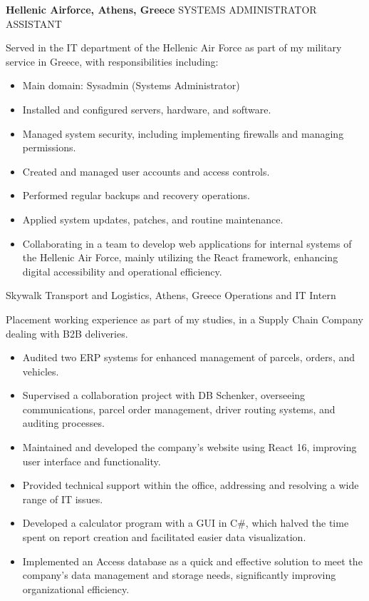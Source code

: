 {\textbf{Hellenic Airforce, Athens, Greece}}
{SYSTEMS ADMINISTRATOR ASSISTANT}
{
    Served in the IT department of the Hellenic Air Force as part of my military service in Greece, with
    responsibilities including:
    \begin{itemize}
        \item Main domain: Sysadmin (Systems Administrator)
        \item Installed and configured servers, hardware, and software.
        \item Managed system security, including implementing firewalls and managing permissions.
        \item Created and managed user accounts and access controls.
        \item Performed regular backups and recovery operations.
        \item Applied system updates, patches, and routine maintenance.
        \item Collaborating in a team to develop web applications for internal systems of the Hellenic Air Force, mainly utilizing
              the React framework, enhancing digital accessibility and operational efficiency.
    \end{itemize}
}

{Skywalk Transport and Logistics, Athens, Greece }
{Operations and IT Intern}
{

    Placement working experience as part of my studies, in a Supply Chain Company dealing with B2B deliveries.
    \begin{itemize}
        \item Audited two ERP systems for enhanced management of parcels, orders, and vehicles.
        \item Supervised a collaboration project with DB Schenker, overseeing communications, parcel order management, driver routing systems, and auditing processes.
        \item Maintained and developed the company's website using React 16, improving user interface and functionality.
        \item Provided technical support within the office, addressing and resolving a wide range of IT issues.
        \item Developed a calculator program with a GUI in C\#, which halved the time spent on report creation and facilitated easier data visualization.
        \item Implemented an Access database as a quick and effective solution to meet the company's data management and storage needs, significantly improving organizational efficiency.

    \end{itemize}
}

